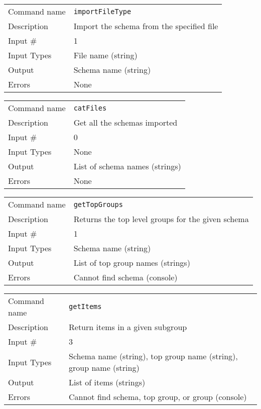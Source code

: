 \noindent
\begin{tabular}{l|p{5in}}
\hline
Command name & {\tt importFileType} \\
Description  & Import the schema from the specified file \\
Input \#     & 1 \\
Input Types  & File name (string) \\
Output       & Schema name (string) \\
Errors       & None \\
\hline
\end{tabular}

\bigskip

\noindent
\begin{tabular}{l|p{5in}}
\hline
Command name & {\tt catFiles} \\
Description  & Get all the schemas imported \\
Input \#     & 0 \\
Input Types  & None \\
Output       & List of schema names (strings) \\
Errors       & None \\
\hline
\end{tabular}

\bigskip

\noindent
\begin{tabular}{l|p{5in}}
\hline
Command name & {\tt getTopGroups} \\
Description  & Returns the top level groups for the given schema \\
Input \#     & 1 \\
Input Types  & Schema name (string) \\
Output       & List of top group names (strings) \\
Errors       & Cannot find schema (console) \\
\hline
\end{tabular}

\bigskip

\noindent
\begin{tabular}{l|p{5in}}
\hline
Command name & {\tt getItems} \\
Description  & Return items in a given subgroup \\
Input \#     & 3 \\
Input Types  & Schema name (string), top group name (string), group name
              (string) \\
Output       & List of items (strings) \\
Errors       & Cannot find schema, top group, or group (console) \\
\hline
\end{tabular}

